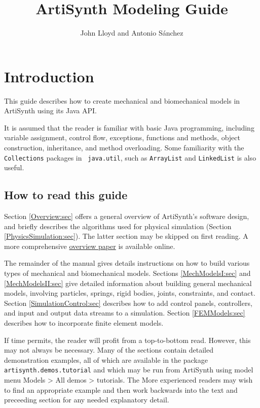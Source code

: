 \documentclass{article}
\title{ArtiSynth Modeling Guide}
\author{John Lloyd and Antonio S\'anchez}
\date{}
\begin{document}
\maketitle

\iflatexml{\large\pubdate}\fi

\tableofcontents



\section{Introduction}

This guide describes how to create mechanical and biomechanical models
in ArtiSynth using its Java API. 

It is assumed that the reader is familiar with basic Java programming,
including variable assignment, control flow, exceptions, functions and
methods, object construction, inheritance, and method overloading.
Some familiarity with the {\tt Collections} packages in {\tt
java.util}, such as {\tt ArrayList} and {\tt LinkedList} is also
useful.

\subsection{How to read this guide}

Section \ref{Overview:sec} offers a general overview of ArtiSynth's
software design, and briefly describes the algorithms used for
physical simulation (Section \ref{PhysicsSimulation:sec}). The latter
section may be skipped on first reading. A more comprehensive
\href{http://www.artisynth.org/doc/artisynth.pdf}{overview paper} is
available online.

The remainder of the manual gives details instructions on how to build
various types of mechanical and biomechanical models.  Sections
\ref{MechModelsI:sec} and \ref{MechModelsII:sec} give detailed
information about building general mechanical models, involving
particles, springs, rigid bodies, joints, constraints, and
contact. Section \ref{SimulationControl:sec} describes how to add control panels,
controllers, and input and output data streams to a simulation.
Section \ref{FEMModels:sec} describes how to incorporate finite
element models.

If time permits, the reader will profit from a top-to-bottom read.
However, this may not always be necessary. Many of the sections
contain detailed demonstration examples, all of which are available in
the package {\tt artisynth.demos.tutorial} and which may be run from
ArtiSynth using model menu {\sf Models > All demos > tutorials}.  The
More experienced readers may wish to find an appropriate example and
then work backwards into the text and preceeding section for any
needed explanatory detail.
\end{document}
